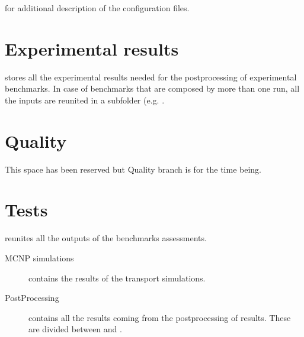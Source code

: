 \documentclass[letterpaper,10pt,english]{sphinxmanual}
\begin{document}
\nopagebreak


\sphinxAtStartPar
{\hyperref[\detokenize{usage/configuration:config}]{}} for additional description of the configuration files.




\section{Experimental results}
\label{\detokenize{usage/folders:experimental-results}}
\sphinxAtStartPar
{} stores all the experimental results needed for the post\sphinxhyphen{}processing of
experimental benchmarks. In case of benchmarks that are composed by more than one run, all the inputs are reunited in a sub\sphinxhyphen{}folder
(e.g. .


\section{Quality}
\label{\detokenize{usage/folders:quality}}
\sphinxAtStartPar
This space has been reserved but Quality branch is 
for the time being.


\section{Tests}
\label{\detokenize{usage/folders:tests}}
\sphinxAtStartPar
{} reunites all the outputs of the benchmarks assessments.
\begin{description}
\item[{MCNP simulations}] \leavevmode
\sphinxAtStartPar
contains the results of the transport simulations.

\item[{Post\sphinxhyphen{}Processing}] \leavevmode
\sphinxAtStartPar
contains all the results coming from the post\sphinxhyphen{}processing of results. These are divided between
 and .

\end{description}
\end{document}
